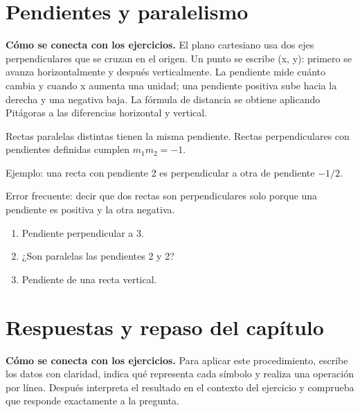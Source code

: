 \documentclass[10pt,oneside,openany]{book}
\begin{document}
\section{Pendientes y paralelismo}

\textbf{Cómo se conecta con los ejercicios.} El plano cartesiano usa dos ejes perpendiculares que se cruzan en el origen. Un punto se escribe (x, y): primero se avanza horizontalmente y después verticalmente. La pendiente mide cuánto cambia y cuando x aumenta una unidad; una pendiente positiva sube hacia la derecha y una negativa baja. La fórmula de distancia se obtiene aplicando Pitágoras a las diferencias horizontal y vertical.

Rectas paralelas distintas tienen la misma pendiente. Rectas perpendiculares con pendientes definidas cumplen $m_1m_2=-1$.

\begin{ejemplo}
Ejemplo: una recta con pendiente 2 es perpendicular a otra de pendiente $-1/2$.
\end{ejemplo}

\begin{ojo}
Error frecuente: decir que dos rectas son perpendiculares solo porque una pendiente es positiva y la otra negativa.
\end{ojo}

\begin{practica}

\begin{enumerate}

\item Pendiente perpendicular a 3.

\item ¿Son paralelas las pendientes 2 y 2?

\item Pendiente de una recta vertical.

\end{enumerate}

\end{practica}



\section{Respuestas y repaso del capítulo}

\textbf{Cómo se conecta con los ejercicios.} Para aplicar este procedimiento, escribe los datos con claridad, indica qué representa cada símbolo y realiza una operación por línea. Después interpreta el resultado en el contexto del ejercicio y comprueba que responde exactamente a la pregunta.
\end{document}
